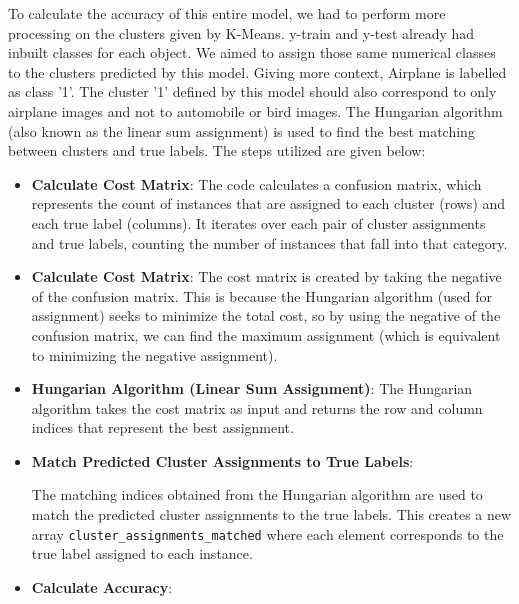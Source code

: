 \documentclass[a4paper]{article}
\theoremstyle{plain}
\theoremstyle{definition}
\begin{document}
{\noindent To calculate the accuracy of this entire model, we had to perform more processing on the clusters given by K-Means. 
\noindent y-train and y-test already had inbuilt classes for each object. We aimed to assign those same numerical classes to the clusters predicted by this model.\newline 
\noindent Giving more context, Airplane is labelled as class '1'. The cluster '1' defined by this model should also correspond to only airplane images and not to automobile or bird images. The Hungarian algorithm (also known as the linear sum assignment) is used to find the best matching between clusters and true labels.
\newline \noindent The steps utilized are given below:
\begin{itemize}
    \item []\textbf{Calculate Cost Matrix}: The code calculates a confusion matrix, which represents the count of instances that are assigned to each cluster (rows) and each true label (columns).
\newline\noindent It iterates over each pair of cluster assignments and true labels, counting the number of instances that fall into that category.
    
    \item[] \textbf{Calculate Cost Matrix}:
  The cost matrix is created by taking the negative of the confusion matrix. This is because the Hungarian algorithm (used for assignment) seeks to minimize the total cost, so by using the negative of the confusion matrix, we can find the maximum assignment (which is equivalent to minimizing the negative assignment).

    \item []\textbf{Hungarian Algorithm (Linear Sum Assignment)}:
The Hungarian algorithm takes the cost matrix as input and returns the row and column indices that represent the best assignment.
            

    \item[] \textbf{Match Predicted Cluster Assignments to True Labels}:
  
The matching indices obtained from the Hungarian algorithm are used to match the predicted cluster assignments to the true labels.
\newline \noindent
This creates a new array \texttt{cluster\_assignments\_matched} where each element corresponds to the true label assigned to each instance.

    \item []\textbf{Calculate Accuracy}:


\end{itemize}}
\end{document}
